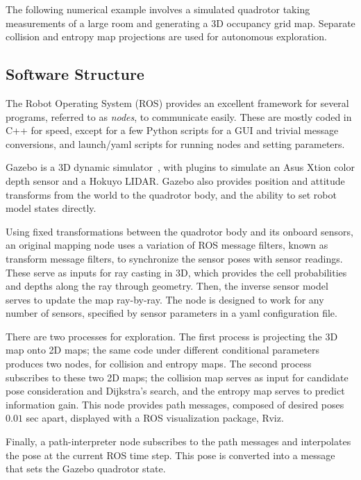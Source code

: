 The following numerical example involves a simulated quadrotor taking measurements of a large room and generating a 3D occupancy grid map. Separate collision and entropy map projections are used for autonomous exploration.

\subsection{Software Structure}

The Robot Operating System (ROS) provides an excellent framework for several programs, referred to as \emph{nodes}, to communicate easily. These are mostly coded in C++ for speed, except for a few Python scripts for a GUI and trivial message conversions, and launch/yaml scripts for running nodes and setting parameters. 

Gazebo is a 3D dynamic simulator~\cite{KaeHow04}, with plugins to simulate an Asus Xtion color depth sensor and a Hokuyo LIDAR. Gazebo also provides position and attitude transforms from the world to the quadrotor body, and the ability to set robot model states directly. 

Using fixed transformations between the quadrotor body and its onboard sensors, an original mapping node uses a variation of ROS message filters, known as transform message filters, to synchronize the sensor poses with sensor readings. These serve as inputs for ray casting in 3D, which provides the cell probabilities and depths along the ray through geometry. Then, the inverse sensor model serves to update the map ray-by-ray.  The node is designed to work for any number of sensors, specified by sensor parameters in a yaml configuration file.

There are two processes for exploration. The first process is projecting the 3D map onto 2D maps; the same code under different conditional parameters produces two nodes, for collision and entropy maps. The second process subscribes to these two 2D maps; the collision map serves as input for candidate pose consideration and Dijkstra's search, and the entropy map serves to predict information gain. This node provides path messages, composed of desired poses $0.01$ sec apart, displayed with a ROS visualization package, Rviz.

Finally, a path-interpreter node subscribes to the path messages and interpolates the pose at the current ROS time step. This pose is converted into a message that sets the Gazebo quadrotor state.



